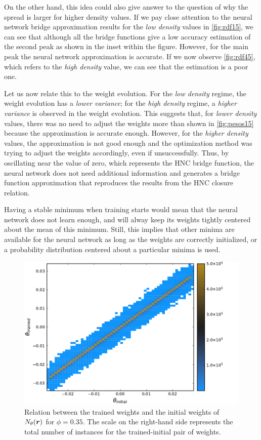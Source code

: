 On the other hand, this idea could also give answer to the question of why the spread
is larger for higher density values. If we pay close attention to the neural network bridge
approximation results for the \emph{low density} values in \autoref{fig:rdf15}, we can see 
that although all the bridge functions give a low accuracy estimation of the second peak as shown in the inset within the figure. However, for the main peak the neural network 
approximation is accurate.
If we now observe \autoref{fig:rdf45}, which refers to the \emph{high density} value,
we can see that the estimation is a poor one.

Let us now relate this to the weight evolution. For the \emph{low density} regime, the 
weight evolution has a \emph{lower variance}; for the \emph{high density} regime, a \emph{higher variance} is observed in the weight evolution.
This suggests that, for \emph{lower density} values, there was no need to adjust the
weights more than shown in \autoref{fig:pesos15} because the approximation is accurate
enough. However, for the \emph{higher density} values, the approximation is not good enough
and the optimization method was trying to adjust the weights accordingly, even if
unsuccessfully.
Thus, by oscillating near the value of zero, which represents the HNC bridge function,
the neural network does not need additional information and generates a bridge function 
approximation that reproduces the results from the HNC closure relation.

Having a stable minimum when training starts would mean that the neural network does not
learn enough, and will alway keep its weights tightly centered about the mean of this
minimum. Still, this implies that other minima are available for the neural network as long
as the weights are correctly initialized, or a probability distribution centered about
a particular minima is used.

\begin{figure}[t]
    \includegraphics[width=\textwidth]{figuras/capitulo-4/weights_phi=0.35.pdf}
    \caption[Comparison between weights, $\phi=0.35$.]{Relation between the trained weights and the initial weights of $N_{\theta}(\bm{r})$ for $\phi=0.35$. The scale on the right-hand side represents the total number of instances for the trained-initial pair of weights.}
    \label{fig:pesos35}
\end{figure}

